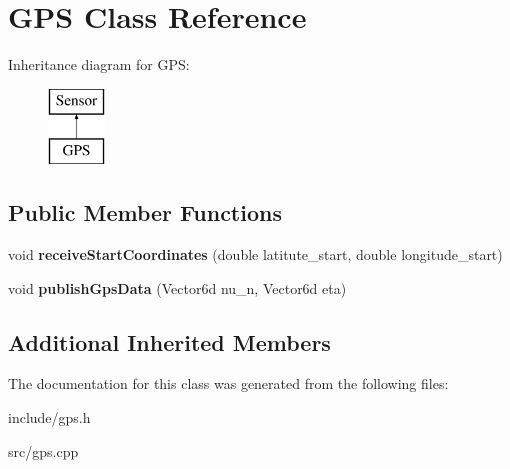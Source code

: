 \section{G\+PS Class Reference}
\label{class_g_p_s}
Inheritance diagram for G\+PS\+:\begin{figure}[H]
\begin{center}
\leavevmode
\includegraphics[height=2.000000cm]{class_g_p_s}
\end{center}
\end{figure}
\subsection*{Public Member Functions}
\begin{DoxyCompactItemize}
\item 
void {\bfseries receive\+Start\+Coordinates} (double latitute\+\_\+start, double longitude\+\_\+start)\label{class_g_p_s_a0d42ac91be4e0f9c53735f60029dac69}

\item 
void {\bfseries publish\+Gps\+Data} (Vector6d nu\+\_\+n, Vector6d eta)\label{class_g_p_s_a772b3562596d25e2992f21c923f29d32}

\end{DoxyCompactItemize}
\subsection*{Additional Inherited Members}


The documentation for this class was generated from the following files\+:\begin{DoxyCompactItemize}
\item 
include/gps.\+h\item 
src/gps.\+cpp\end{DoxyCompactItemize}
